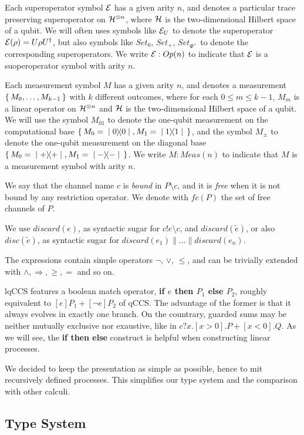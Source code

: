 Each superoperator symbol $\mathcal{E}$ has a given arity $n$, and denotes a particular trace preserving superoperator on $\mathcal{H}^{\otimes n}$, where $\mathcal{H}$ is the two-dimensional Hilbert space of a qubit. We will often uses symbols like $\mathcal{E}_U$ to denote the superoperator $\mathcal{E}(\rho) = U \rho U^\dagger$, but also symbols like $Set_0$, $Set_+$, 
$Set_{\Phi^+}$ to denote the corresponding superoperators. We write $\mathcal{E}: Op(n)$ to indicate  that $\mathcal{E}$ is a suoperoperator symbol with arity $n$.

Each measurement symbol $M$ has a given arity $n$, and denotes a measurement $\set{M_0, \ldots, M_{k-1}}$ with $k$ different outcomes, where for each $0 \leq m \leq k-1$, $M_m$ is a linear operator on $\mathcal{H}^{\otimes n}$ and $\mathcal{H}$ is the two-dimensional Hilbert space of a qubit. We will use the symbol $M_{01}$ to denote the one-qubit measurement on the computational base $\set{M_0 = \ket{0}\!\!\bra{0}, M_1=\ket{1}\!\!\bra{1}}$, and the symbol $M_\pm$ to denote the one-qubit measurement on the diagonal base $\set{M_0 = \ket{+}\!\!\bra{+}, M_1 = \ket{-}\!\!\bra{-}}$. We write $M: Meas(n)$ to indicate  that $M$ is a measurement symbol with arity $n$.

We say that the channel name $c$ is \textit{bound} in $P\setminus c$, and it is \textit{free} when it is not bound by any restriction operator. We denote with $\mathit{fc}(P)$ the set of free channels of $P$.

We use $discard(e)$, as syntactic sugar for $c!e \setminus c$, and $discard(\widetilde{e})$, or also $disc(\widetilde{e})$, as syntactic sugar for $discard(e_1)\parallel \ldots\parallel discard(e_n)$.

The expressions contain simple operators $\neg$, $\vee$, $\leq$, and  can be trivially extended with $\wedge, \Rightarrow, \geq, =$ and so on.

lqCCS features a boolean match operator, \textbf{if $e$ then $P_1$ else $P_2$}, roughly equivalent to $[e]P_1 + [\neg e]P_2$ of qCCS. The advantage of the former is that it always evolves in exactly one branch. On the countrary, guarded sums may be neither mutually  exclusive nor exaustive, like in $c?x.[x > 0].P + [x < 0].Q$. As we will see, the \textbf{if then else} construct is helpful when constructing linear processes.

We decided to keep the presentation as simple as possible, hence to mit recursively defined processes. This simplifies our type system and the comparison with other calculi.


\subsection{Type System}

